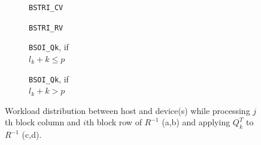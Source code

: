 \documentclass{llncs}
\begin{document}
\begin{figure}[t]%
  \centering

  \begin{subfigure}[t]{0.2\linewidth}
    \scalebox{0.59}{}
    \caption{{\tt BSTRI\_CV} \label{fig:BSTRI_CV_HostDevice_workload}}
  \end{subfigure}
  \begin{subfigure}[t]{0.4\linewidth}
    \scalebox{0.59}{}
    \caption{{\tt BSTRI\_RV}\label{fig:BSTRI_RV_HostDevice_workload}}
  \end{subfigure}
  \begin{subfigure}[t]{0.17\linewidth}
    \scalebox{0.59}{}
    \caption{{\tt BSOI\_Qk}, if \\$l_k + k \leq p$ \label{fig:BSOI_Qk_HostDevice_workload1}}
  \end{subfigure}
  \begin{subfigure}[t]{0.17\linewidth}
    \scalebox{0.59}{}
    \caption{{\tt BSOI\_Qk}, if \\$l_k + k > p$ \label{fig:BSOI_Qk_HostDevice_workload2}}
  \end{subfigure}

  \caption[]{Workload distribution between host and device(s) 
    while processing 
    $j$th block column and $i$th block row of $R^{-1}$ (a,b) 
    and applying $Q_k^T$ to $R^{-1}$ (c,d).\footnotemark}
  \label{fig:HostDevice_workload}
\end{figure}
\end{document}
